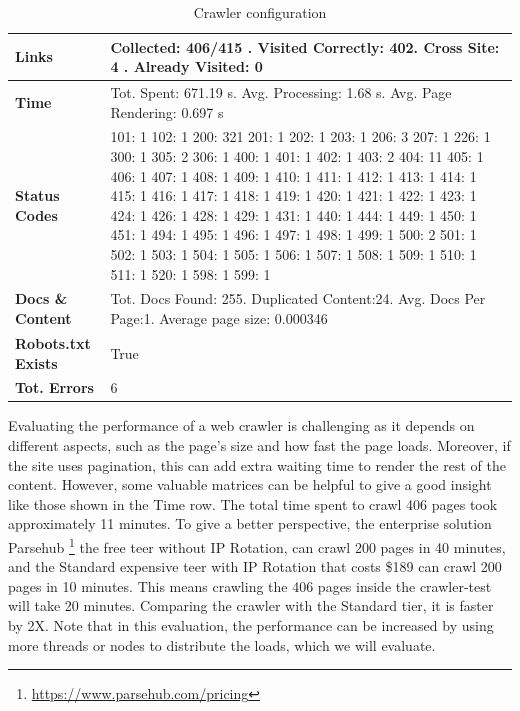{\begin{table}[ht] 
{\footnotesize
\begin{tabular}{ P{3cm} ||P{10.1cm}  }      %
 \hline \hline
\textbf{Links} & Collected: 406/415 . Visited Correctly: 402. Cross Site: 4 . Already Visited: 0\T\B 
\\ 
\hline
\textbf{Time} & Tot. Spent: 671.19 s. Avg. Processing: 1.68 s. Avg. Page Rendering: 0.697 s\T\B 
\\
\hline
\textbf{Status Codes} &   101: 1  102: 1  200: 321  201: 1  202: 1  203: 1  206: 3  207: 1  226: 1  300: 1  305: 2  306: 1  400: 1  401: 1  402: 1  403: 2  404: 11  405: 1  406: 1  407: 1  408: 1  409: 1  410: 1  411: 1  412: 1  413: 1  414: 1  415: 1  416: 1  417: 1  418: 1  419: 1  420: 1  421: 1  422: 1  423: 1  424: 1  426: 1  428: 1  429: 1  431: 1  440: 1  444: 1  449: 1  450: 1  451: 1  494: 1  495: 1  496: 1  497: 1  498: 1  499: 1  500: 2  501: 1  502: 1  503: 1  504: 1  505: 1  506: 1  507: 1  508: 1  509: 1  510: 1  511: 1  520: 1  598: 1  
599: 1\T\B 
\\ 
\hline
\textbf{Docs \& Content} & Tot. Docs Found: 255. Duplicated Content:24. Avg. Docs Per Page:1. Average page size: 0.000346\T\B 
\\ 
\hline
\textbf{Robots.txt Exists} & True\T\B 
\\ 
\hline
\textbf{Tot. Errors} & 6\T\B 
\\ 
\hline \hline
    \end{tabular}
}
  \captionsetup{justification=centering,margin=2cm}
  \caption{Crawler configuration}
    \label{table:crawler_test_result}
\end{table}


Evaluating the performance of a web crawler is challenging as it depends on different aspects, such as the page's size and how fast the page loads. Moreover, if the site uses pagination, this can add extra waiting time to render the rest of the content. However, some valuable matrices can be helpful to give a good insight like those shown in the Time row. The total time spent to crawl 406 pages took approximately 11 minutes. To give a better perspective, the enterprise solution Parsehub \footnote{\url{https://www.parsehub.com/pricing}} the free teer without IP Rotation, can crawl 200 pages in 40 minutes, and the Standard expensive teer with IP Rotation that costs \$189 can crawl 200 pages in 10 minutes. This means crawling the 406 pages inside the crawler-test will take 20 minutes. Comparing the crawler with the Standard tier, it is faster by 2X. Note that in this evaluation, the performance can be increased by using more threads or nodes to distribute the loads, which we will evaluate. 


}
